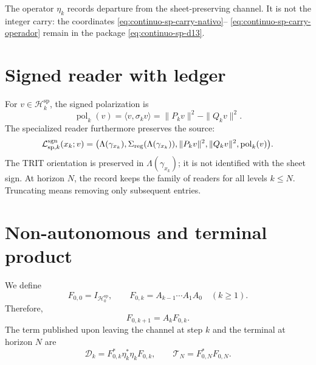 The operator \(\eta_k\) records departure from the sheet-preserving channel. It
is not the integer carry: the coordinates
\eqref{eq:continuo-sp-carry-nativo}--
\eqref{eq:continuo-sp-carry-operador} remain in the package
\eqref{eq:continuo-sp-d13}.

\section{Signed reader with ledger}

For \(v\in\mathcal H_k^{\mathrm{sp}}\), the signed polarization is
\begin{equation}
\label{eq:continuo-sp-polarizacion-firmada}
 \operatorname{pol}_k(v)
 =\langle v,\sigma_kv\rangle
 =\|P_kv\|^2-\|Q_kv\|^2.
\end{equation}
The specialized reader furthermore preserves the source:
\begin{equation}
\label{eq:continuo-sp-lector-firmado}
 \mathcal L^{\rm sgn}_{\mathrm{sp},k}(x_k;v)
 =\bigl(
   \Lambda(\gamma_{x_k}),
   \Sigma_{\rm reg}(\Lambda(\gamma_{x_k})),
   \|P_kv\|^2,
   \|Q_kv\|^2,
   \operatorname{pol}_k(v)\bigr).
\end{equation}
The TRIT orientation is preserved in \(\Lambda(\gamma_{x_k})\); it is not
identified with the sheet sign. At horizon \(N\), the record keeps the
family of readers for all levels \(k\leq N\). Truncating means
removing only subsequent entries.

\section{Non-autonomous and terminal product}

We define
\begin{equation}
\label{eq:continuo-sp-f-producto}
 F_{0,0}=I_{\mathcal H_0^{\mathrm{sp}}},
 \qquad
 F_{0,k}=A_{k-1}\cdots A_1A_0
 \quad(k\geq1).
\end{equation}
Therefore,
\begin{equation}
\label{eq:continuo-sp-f-recursion}
 F_{0,k+1}=A_kF_{0,k}.
\end{equation}
The term published upon leaving the channel at step \(k\) and the terminal at
horizon \(N\) are
\begin{equation}
\label{eq:continuo-sp-defecto-terminal}
 \mathcal D_k=F_{0,k}^*\eta_k^*\eta_kF_{0,k},
 \qquad
 \mathcal T_N=F_{0,N}^*F_{0,N}.
\end{equation}

